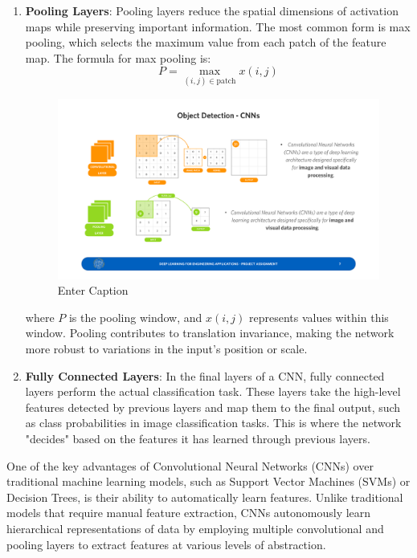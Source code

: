 \begin{enumerate}
    \item \textbf{Pooling Layers}: Pooling layers reduce the spatial dimensions of activation maps while preserving important information. The most common form is max pooling, which selects the maximum value from each patch of the feature map. The formula for max pooling is:
    \begin{equation}
        P = \max_{(i,j) \in \text{patch}} x(i,j)
    \end{equation}
    \begin{figure}[H]
        \centering
        \includegraphics[width=0.85\linewidth]{LateX//figs/CNN_poolinh.pdf}
        \caption{Enter Caption}
        \label{fig:enter-label}
    \end{figure}
    where \( P \) is the pooling window, and \( x(i,j) \) represents values within this window. Pooling contributes to translation invariance, making the network more robust to variations in the input's position or scale.

    \item \textbf{Fully Connected Layers}: In the final layers of a CNN, fully connected layers perform the actual classification task. These layers take the high-level features detected by previous layers and map them to the final output, such as class probabilities in image classification tasks. This is where the network "decides" based on the features it has learned through previous layers.
\end{enumerate}

One of the key advantages of Convolutional Neural Networks (CNNs) over traditional machine learning models, such as Support Vector Machines (SVMs) or Decision Trees, is their ability to automatically learn features. Unlike traditional models that require manual feature extraction, CNNs autonomously learn hierarchical representations of data by employing multiple convolutional and pooling layers to extract features at various levels of abstraction.

